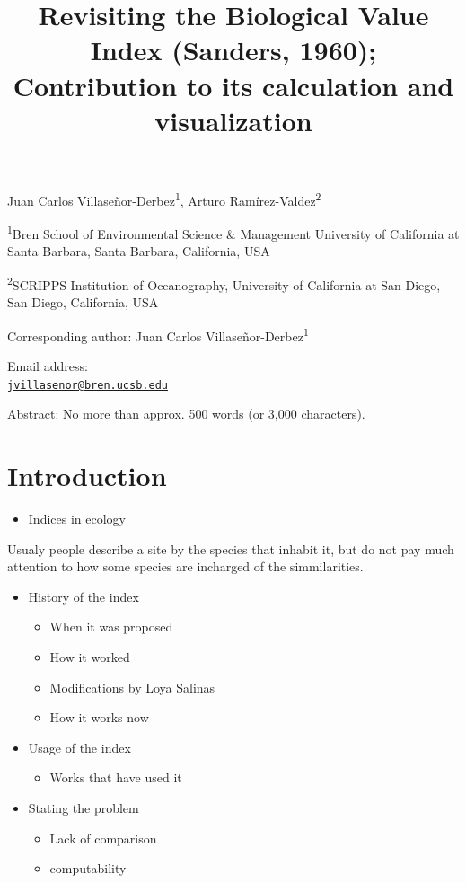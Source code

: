 \documentclass[12pt,]{article}
\title{\Large{Revisiting the Biological Value Index (Sanders, 1960); Contribution to its calculation and visualization}}
\author{}
\date{}
\providecommand{\tightlist}{%
  \setlength{\itemsep}{0pt}\setlength{\parskip}{0pt}}
\begin{document}
\maketitle

Juan Carlos Villaseñor-Derbez\textsuperscript{1}, Arturo
Ramírez-Valdez\textsuperscript{2}

\textsuperscript{1}Bren School of Environmental Science \& Management
University of California at Santa Barbara, Santa Barbara, California,
USA

\textsuperscript{2}SCRIPPS Institution of Oceanography, University of
California at San Diego, San Diego, California, USA

Corresponding author: Juan Carlos Villaseñor-Derbez\textsuperscript{1}

Email address:\\
\href{mailto:jvillasenor@bren.ucsb.edu}{\nolinkurl{jvillasenor@bren.ucsb.edu}}

\clearpage

Abstract: No more than approx. 500 words (or 3,000 characters).

\section{Introduction}\label{introduction}

\begin{itemize}
\tightlist
\item
  Indices in ecology
\end{itemize}

Usualy people describe a site by the species that inhabit it, but do not
pay much attention to how some species are incharged of the
simmilarities.

\begin{itemize}
\tightlist
\item
  History of the index

  \begin{itemize}
  \tightlist
  \item
    When it was proposed
  \item
    How it worked
  \item
    Modifications by Loya Salinas
  \item
    How it works now
  \end{itemize}
\item
  Usage of the index

  \begin{itemize}
  \tightlist
  \item
    Works that have used it
  \end{itemize}
\item
  Stating the problem

  \begin{itemize}
  \tightlist
  \item
    Lack of comparison
  \item
    computability
  \end{itemize}
\end{itemize}
\end{document}

